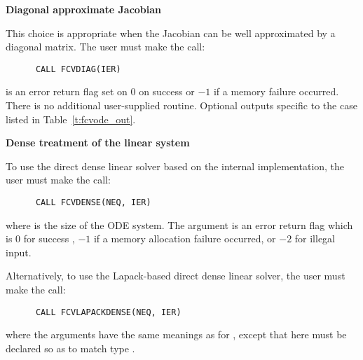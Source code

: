 \begin{Steps}

  {\s} {\bf Diagonal approximate Jacobian}
  
  This choice is appropriate when the Jacobian can be well approximated by
  a diagonal matrix.  The user must make the call:
\begin{verbatim}
      CALL FCVDIAG(IER)
\end{verbatim}
   is an error return flag set on $0$ on success or $-1$ if a memory 
  failure occurred.
  There is no additional user-supplied routine. Optional outputs specific
  to the {\diag} case listed in Table~\ref{t:fcvode_out}.
  

  {\s} {\bf Dense treatment of the linear system}
  
  To use the direct dense linear solver based on the internal {\cvode}
  implementation, the user must make the call:
\begin{verbatim}
      CALL FCVDENSE(NEQ, IER)
\end{verbatim}
  where  is the size of the ODE system.
  The argument  is an error return flag which is $0$ for success , 
  $-1$ if a memory allocation failure occurred, or $-2$ for illegal input.

  Alternatively, to use the Lapack-based direct dense linear solver, 
  the user must make the call:
\begin{verbatim}
      CALL FCVLAPACKDENSE(NEQ, IER)
\end{verbatim}
  where the arguments have the same meanings as for , except
  that here  must be declared so as to match {\C} type .


\end{Steps}
